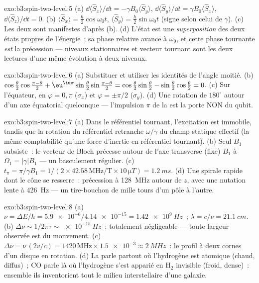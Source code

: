 \begin{solution}{exo:b3:spin-two-level:5}
(a) $\dd\langle\hat S_x\rangle/\dd t = -\gamma B_0\langle\hat
S_y\rangle$, $\dd\langle\hat S_y\rangle/\dd t = \gamma
B_0\langle\hat S_x\rangle$, $\dd\langle\hat S_z\rangle/\dd t = 0$.
(b) $\langle\hat S_x\rangle = \tfrac\hbar2\cos\omega_0t$,
$\langle\hat S_y\rangle = \tfrac\hbar2\sin\omega_0t$ (signe selon
celui de $\gamma$). (c) Les deux sont manifestes d'après (b). (d)
L'état est une \emph{superposition} des deux états propres de
l'énergie~; sa phase relative avance à $\omega_0$, et cette phase
tournante \emph{est} la précession --- niveaux stationnaires et
vecteur tournant sont les deux lectures d'une même évolution à deux
niveaux.
\end{solution}

\begin{solution}{exo:b3:spin-two-level:6}
(a) Substituer et utiliser les identités de l'angle moitié. (b)
$\cos\tfrac\theta2\cos\tfrac{\pi-\theta}2 +
\eu^{\iu\pi}\sin\tfrac\theta2\sin\tfrac{\pi-\theta}2 =
\cos\tfrac\theta2\sin\tfrac\theta2 -
\sin\tfrac\theta2\cos\tfrac\theta2 = 0$. (c) Sur l'équateur, en
$\varphi = 0, \pi$ ($\sigma_x$) et $\varphi = \pm\pi/2$
($\sigma_y$). (d) Une rotation de $180^\circ$ autour d'un axe
équatorial quelconque --- l'impulsion $\pi$ de la  est la porte NON du qubit.
\end{solution}

\begin{solution}{exo:b3:spin-two-level:7}
(a) Dans le référentiel tournant, l'excitation est immobile, tandis
que la rotation du référentiel retranche $\omega/\gamma$ du champ
statique effectif (la même comptabilité qu'une force d'inertie en
référentiel tournant). (b) Seul $B_1$ subsiste~: le vecteur de Bloch
précesse autour de l'axe transverse (fixe) $B_1$ à
$\Omega_1 = |\gamma|B_1$ --- un basculement régulier. (c) $t_\pi = \pi/\gamma B_1 = 1/(2 \times 42.58\,\text{
MHz/T} \times 10\,\unit{\micro T}) = \qty{1.2}{ms}$. (d) Une spirale
rapide dont le cône se resserre~: précession à \qty{128}{MHz} autour
de $z$, avec une nutation lente à \qty{426}{Hz} --- un tire-bouchon
de mille tours d'un pôle à l'autre.
\end{solution}

\begin{solution}{exo:b3:spin-two-level:8}
(a) $\nu = \Delta E/h = \num{5.9e-6}/\num{4.14e-15} =
\qty{1.42e9}{Hz}$~; $\lambda = c/\nu = \qty{21.1}{cm}$. (b) $\Delta
\nu \sim 1/2\pi\tau \sim \qty{e-15}{Hz}$~: totalement négligeable ---
toute largeur observée est du mouvement. (c) $\Delta\nu =
\nu\,(2v/c) = 1420\,\text{MHz} \times \num{1.5e-3} \approx
\qty{2}{MHz}$~: le profil à deux cornes d'un disque en rotation. (d)
La  parle partout où l'hydrogène est atomique (chaud,
diffus)~; CO parle là où l'hydrogène s'est apparié en H$_2$ invisible
(froid, dense)~: ensemble ils inventorient tout le milieu
interstellaire d'une galaxie.
\end{solution}

